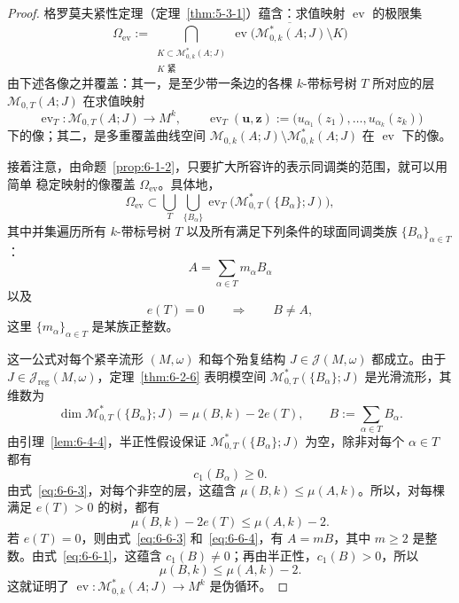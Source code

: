 \begin{proof}
格罗莫夫紧性定理（定理~\ref{thm:5-3-1}）蕴含：求值映射
$\operatorname{ev}$ 的极限集
\[
  \Omega_{\operatorname{ev}}
  :=
  \bigcap_{\substack{K\subset\mathcal M^*_{0,k}(A;J)\\K\text{ 紧}}}
  \overline{\operatorname{ev}
  \bigl(\mathcal M^*_{0,k}(A;J)\setminus K\bigr)}
\]
由下述各像之并覆盖：其一，是至少带一条边的各棵 $k$-带标号树 $T$ 所对应的层
$\mathcal M_{0,T}(A;J)$ 在求值映射
\[
  \operatorname{ev}_T:\mathcal M_{0,T}(A;J)\longrightarrow M^k,
  \qquad
  \operatorname{ev}_T(\mathbf u,\mathbf z)
  :=\bigl(u_{\alpha_1}(z_1),\ldots,u_{\alpha_k}(z_k)\bigr)
\]
下的像；其二，是多重覆盖曲线空间
$\mathcal M_{0,k}(A;J)\setminus\mathcal M^*_{0,k}(A;J)$ 在
$\operatorname{ev}$ 下的像。

接着注意，由命题~\ref{prop:6-1-2}，只要扩大所容许的表示同调类的范围，就可以用简单
稳定映射的像覆盖 $\Omega_{\operatorname{ev}}$。具体地，
\begin{equation}\label{eq:6-6-2}
  \Omega_{\operatorname{ev}}
  \subset
  \bigcup_T\ \bigcup_{\{B_\alpha\}}
  \operatorname{ev}_T
  \bigl(\mathcal M^*_{0,T}(\{B_\alpha\};J)\bigr),
\end{equation}
其中并集遍历所有 $k$-带标号树 $T$ 以及所有满足下列条件的球面同调类族
$\{B_\alpha\}_{\alpha\in T}$：
\begin{equation}\label{eq:6-6-3}
  A=\sum_{\alpha\in T}m_\alpha B_\alpha
\end{equation}
以及
\begin{equation}\label{eq:6-6-4}
  e(T)=0\qquad\Longrightarrow\qquad B\ne A,
\end{equation}
这里 $\{m_\alpha\}_{\alpha\in T}$ 是某族正整数。

这一公式对每个紧辛流形 $(M,\omega)$ 和每个殆复结构
$J\in\mathcal J(M,\omega)$ 都成立。由于
$J\in\mathcal J_{\mathrm{reg}}(M,\omega)$，定理~\ref{thm:6-2-6} 表明模空间
$\mathcal M^*_{0,T}(\{B_\alpha\};J)$ 是光滑流形，其维数为
\[
  \dim\mathcal M^*_{0,T}(\{B_\alpha\};J)
  =\mu(B,k)-2e(T),
  \qquad
  B:=\sum_{\alpha\in T}B_\alpha.
\]
由引理~\ref{lem:6-4-4}，半正性假设保证
$\mathcal M^*_{0,T}(\{B_\alpha\};J)$ 为空，除非对每个 $\alpha\in T$ 都有
\[
  c_1(B_\alpha)\ge0.
\]
由式~\eqref{eq:6-6-3}，对每个非空的层，这蕴含
$\mu(B,k)\le\mu(A,k)$。所以，对每棵满足 $e(T)>0$ 的树，都有
\[
  \mu(B,k)-2e(T)\le\mu(A,k)-2.
\]
若 $e(T)=0$，则由式~\eqref{eq:6-6-3} 和~\eqref{eq:6-6-4}，有
$A=mB$，其中 $m\ge2$ 是整数。由式~\eqref{eq:6-6-1}，这蕴含
$c_1(B)\ne0$；再由半正性，$c_1(B)>0$，所以
\[
  \mu(B,k)\le\mu(A,k)-2.
\]
这就证明了
$\operatorname{ev}:\mathcal M^*_{0,k}(A;J)\to M^k$ 是伪循环。


\end{proof}
